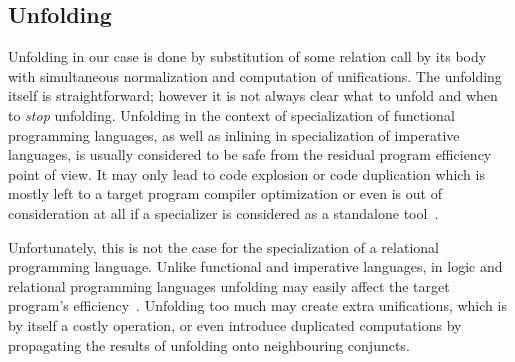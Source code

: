 

\subsection{Unfolding}

Unfolding in our case is done by substitution of some relation call by its body with simultaneous normalization and computation of unifications.
The unfolding itself is straightforward; however it is not always clear what to unfold and when to \emph{stop} unfolding.
Unfolding in the context of specialization of functional programming languages, as well as inlining in specialization of imperative languages, is usually considered to be safe from the residual program efficiency point of view.
It may only lead to code explosion or code duplication which is mostly left to a target program compiler optimization or even is out of consideration at all if a specializer is considered as a standalone tool~\cite{jonesbook}.

Unfortunately, this is not the case for the specialization of a relational programming language.
Unlike functional and imperative languages, in logic and relational programming languages unfolding may easily affect the target program's efficiency~\cite{leuschel2002logic, gallagher1993tutorial}.
Unfolding too much may create extra unifications, which is by itself a costly operation, or even introduce duplicated computations by propagating the results of unfolding onto neighbouring conjuncts.

